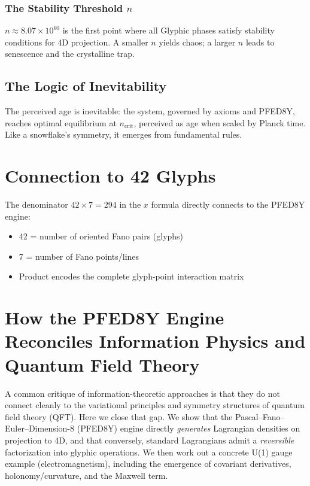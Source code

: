 \documentclass[pdflatex,sn-mathphys-num]{sn-jnl}
\theoremstyle{thmstyleone}
\theoremstyle{thmstyletwo}
\theoremstyle{thmstylethree}
\begin{document}
\subsubsection{The Stability Threshold $n$}
$n \approx 8.07 \times 10^{60}$ is the first point where all Glyphic phases satisfy stability conditions for 4D projection. A smaller $n$ yields chaos; a larger $n$ leads to senescence and the crystalline trap.

\subsection{The Logic of Inevitability}\label{subsec:s1-inevitability}
The perceived age is inevitable: the system, governed by axioms and PFED8Y, reaches optimal equilibrium at $n_{\text{crit}}$, perceived as age when scaled by Planck time. Like a snowflake's symmetry, it emerges from fundamental rules.

\section{Connection to 42 Glyphs}\label{sec:s1-connection}
The denominator $42 \times 7 = 294$ in the $x$ formula directly connects to the PFED8Y engine:

\begin{itemize}
    \item 42 = number of oriented Fano pairs (glyphs)
    \item 7 = number of Fano points/lines
    \item Product encodes the complete glyph-point interaction matrix
\end{itemize}

\section{How the PFED8Y Engine Reconciles Information Physics and Quantum Field Theory}
\label{sec:PFED8Y-QFT}

A common critique of information-theoretic approaches is that they do not connect cleanly to the variational principles and symmetry structures of quantum field theory (QFT). Here we close that gap. We show that the Pascal--Fano--Euler--Dimension-8 (PFED8Y) engine directly \emph{generates} Lagrangian densities on projection to 4D, and that conversely, standard Lagrangians admit a \emph{reversible} factorization into glyphic operations. We then work out a concrete U(1) gauge example (electromagnetism), including the emergence of covariant derivatives, holonomy/curvature, and the Maxwell term.
\end{document}
